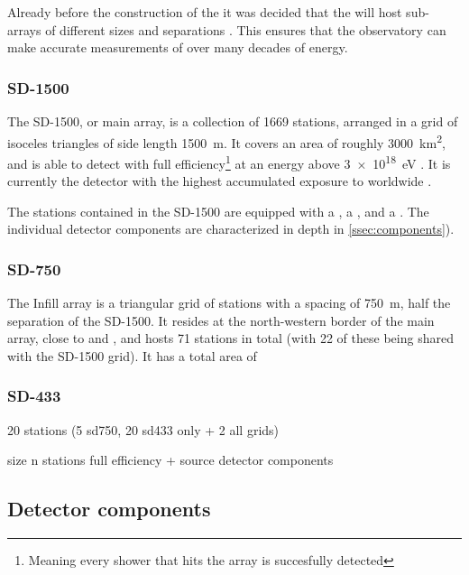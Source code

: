 Already before the construction of the \PAO it was decided that the \SD will 
host sub-arrays of different sizes and separations 
\cite{watsonDevelopmentPierreAuger}. This ensures that the observatory can 
make accurate measurements of \EAS over many decades of energy.

\subsubsection{SD-1500}

The SD-1500, or main array, is a collection of 1669 stations, arranged in a grid
of isoceles triangles of side length \SI{1500}{\meter}. It covers an area of 
roughly \SI{3000}{\kilo\meter\squared}, and is able to detect \EASs with full 
efficiency\footnote{Meaning every shower that hits the array is succesfully 
detected} at an energy above \SI{3e18}{\eV} 
\cite{abrahamTriggerApertureSurface2010}. It is currently the detector with the 
highest accumulated exposure to \CRs worldwide 
\cite{aabPierreAugerObservatory2020}.

The stations contained in the SD-1500 are equipped with a \WCD, a \SSD, and a
\RD. The individual detector components are characterized in depth in 
\cref{ssec:components}).

\subsubsection{SD-750}

The Infill array is a triangular grid of stations with a spacing of 
\SI{750}{\meter}, half the separation of the SD-1500. It resides at the 
north-western border of the main array, close to \CO and \HEAT, and hosts 71 
stations in total (with 22 of these being shared with the SD-1500 grid). It has
a total area of

\subsubsection{SD-433}

20 stations (5 sd750, 20 sd433 only + 2 all grids)

size
n stations
full efficiency + source
detector components



\subsection{Detector components}
\label{ssec:detector-components}


